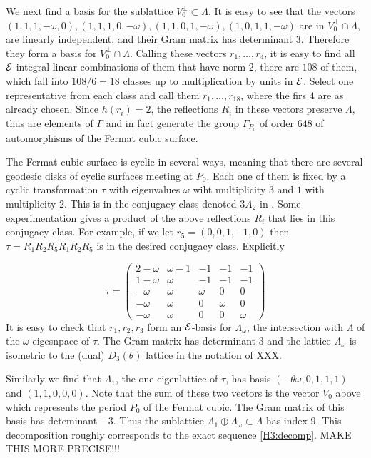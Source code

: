 \documentclass[11pt]{amsart}
\begin{document}
 We next find a basis for the sublattice $V_0^\bot \subset\Lambda$.  It is easy to see that the vectors $(1,1,1,-\omega,0), (1,1,1,0,-\omega), (1,1,0,1,-\omega), (1,0,1,1,-\omega)$ are in $V_0^\bot\cap\Lambda$, are linearly independent, and their Gram matrix has determinant $3$.   Therefore they form a basis for $V_0^\bot\cap\Lambda$.    Calling these vectors $r_1,\dots,r_4$, it is easy to find all ${\mathcal E}$-integral linear combinations of them that have norm $2$, there are $108$ of them, which fall into $108/6 = 18$ classes up to multiplication by units in ${\mathcal E}$.   Select one representative from each class and call them $r_1,\dots,r_{18}$, where the firs $4$ are as already chosen.  Since $h(r_i) = 2$, the reflections $R_i$ in these vectors preserve $\Lambda$, thus are elements of $\Gamma$ and in fact generate the group $\Gamma_{P_0}$ of order $648$ of automorphisms of the Fermat cubic surface.
 
 The Fermat cubic surface is cyclic in several ways, meaning that there are several geodesic disks of cyclic surfaces meeting at $P_0$.   Each one of them is fixed by a cyclic transformation $\tau$ with eigenvalues $\omega$ wiht multiplicity $3$ and $1$ with multiplicity $2$.  This is in the conjugacy class denoted $3 A_2$ in \cite{Dolgachev, Hosoh}.   Some experimentation gives a product of the above reflections  $R_i$ that lies in this conjugacy class.  For example, if we let $r_5 = (0,0,1,-1,0)$ then $\tau = R_1R_2R_5R_1R_2R_5$ is in the desired conjugacy class.
Explicitly

\begin{equation}
\label{eq-tau}
\tau =
\left(\begin{array}{ccccc} 2 - \omega & \omega - 1 & -1 & -1 & -1 \\1 -\omega & \omega  & -1 & -1 & -1 \\ -\omega & \omega & \omega & 0 & 0 \\ -\omega & \omega & 0 & \omega & 0 \\ -\omega & \omega & 0 & 0 & \omega \end{array}\right)
\end{equation}
It is easy to check that $r_1, r_2, r_3$ form an ${\mathcal E}$-basis for $\Lambda_\omega$, the intersection with $\Lambda$ of the $\omega$-eigesnpace of $\tau$.   The Gram matrix has determinant $3$ and the lattice $\Lambda_\omega$ is isometric to the (dual) $D_3(\theta)$ lattice in the notation of XXX. 

Similarly we find that $\Lambda_1$,  the one-eigenlattice of $\tau$, has basis $(-\theta\omega,0,1,1,1)$ and $(1,1,0,0,0)$.   Note that the sum of these two vectors is the vector $V_0$ above which represents the period $P_0$ of the Fermat cubic.   The Gram matrix of this basis has deteminant $-3$.
Thus the sublattice $\Lambda_1\oplus\Lambda_\omega\subset\Lambda$ has index $9$.    This decomposition roughly corresponds to the exact sequence  \ref{H3:decomp}.  MAKE THIS MORE PRECISE!!!  
\end{document}
